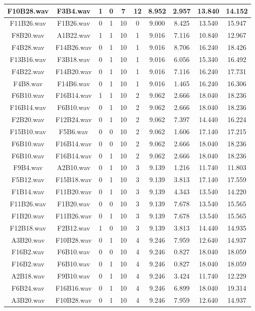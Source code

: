 \documentclass[11pt,a4paper]{book}
\begin{document}
\begin{longtable}[c]{|c|c|c|c|c|c|c|c|c|c|}
F10B28.wav&F3B4.wav&1&0&7&12&8.952&2.957&13.840&14.152\\ \hline
F11B26.wav&F1B26.wav&0&1&10&0&9.000&8.425&13.540&15.947\\ \hline
F8B20.wav&A1B22.wav&1&1&10&1&9.016&7.116&10.840&12.967\\ \hline
F4B28.wav&F14B26.wav&0&1&10&1&9.016&8.706&16.240&18.426\\ \hline
F13B16.wav&F3B18.wav&0&1&10&1&9.016&6.056&15.340&16.492\\ \hline
F4B22.wav&F14B20.wav&0&1&10&1&9.016&7.116&16.240&17.731\\ \hline
F4B8.wav&F14B6.wav&0&1&10&1&9.016&1.465&16.240&16.306\\ \hline
F6B10.wav&F16B14.wav&1&1&10&2&9.062&2.666&18.040&18.236\\ \hline
F16B14.wav&F6B10.wav&0&1&10&2&9.062&2.666&18.040&18.236\\ \hline
F2B20.wav&F12B24.wav&0&1&10&2&9.062&7.397&14.440&16.224\\ \hline
F15B10.wav&F5B6.wav&0&0&10&2&9.062&1.606&17.140&17.215\\ \hline
F6B10.wav&F16B14.wav&0&0&10&2&9.062&2.666&18.040&18.236\\ \hline
F6B10.wav&F16B14.wav&0&1&10&2&9.062&2.666&18.040&18.236\\ \hline
F9B4.wav&A2B10.wav&0&1&10&3&9.139&1.216&11.740&11.803\\ \hline
F5B12.wav&F15B18.wav&0&1&10&3&9.139&3.813&17.140&17.559\\ \hline
F1B14.wav&F11B20.wav&0&1&10&3&9.139&4.343&13.540&14.220\\ \hline
F11B26.wav&F1B20.wav&0&0&10&3&9.139&7.678&13.540&15.565\\ \hline
F1B20.wav&F11B26.wav&0&1&10&3&9.139&7.678&13.540&15.565\\ \hline
F12B18.wav&F2B12.wav&1&0&10&3&9.139&3.813&14.440&14.935\\ \hline
A3B20.wav&F10B28.wav&0&1&10&4&9.246&7.959&12.640&14.937\\ \hline
F16B2.wav&F6B10.wav&0&0&10&4&9.246&0.827&18.040&18.059\\ \hline
F16B2.wav&F6B10.wav&0&1&10&4&9.246&0.827&18.040&18.059\\ \hline
A2B18.wav&F9B10.wav&0&1&10&4&9.246&3.424&11.740&12.229\\ \hline
F6B24.wav&F16B16.wav&0&1&10&4&9.246&6.899&18.040&19.314\\ \hline
A3B20.wav&F10B28.wav&0&1&10&4&9.246&7.959&12.640&14.937\\ \hline

\end{longtable}
\end{document}
